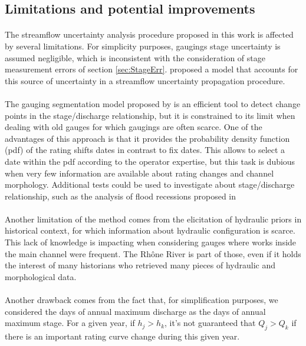 \documentclass[11pt]{article}
\begin{document}
    
    \subsection{Limitations and potential improvements}
    \paragraph{}
    The streamflow uncertainty analysis procedure proposed in this work is affected by several limitations. For simplicity purposes, gaugings stage uncertainty is assumed negligible, which is inconsistent with the consideration of stage measurement errors of section \ref{sec:StageErr}. \citet{horner_impact_2018} proposed a model that accounts for this source of uncertainty in a streamflow uncertainty propagation procedure.  
    \paragraph{}
    The gauging segmentation model proposed by \citet{darienzo_detection_2021} is an efficient tool to detect change points in the stage/discharge relationship, but it is constrained to its limit when dealing with old gauges for which gaugings are often scarce. One of the advantages of this approach is that it provides the probability density function (pdf) of the rating shifts dates in contrast to fix dates. This allows to select a date within the pdf according to the operator expertise, but this task is dubious when very few information are available about rating changes and channel morphology. Additional tests could be used to investigate about stage/discharge relationship, such as the analysis of flood recessions proposed in \citet{darienzo_detection_2021-1}
    \paragraph{}
    Another limitation of the method comes from the elicitation of hydraulic priors in historical context, for which information about hydraulic configuration is scarce. This lack of knowledge is impacting when considering gauges where works inside the main channel were frequent. The Rhône River is part of those, even if it holds the interest of many historians who retrieved many pieces of hydraulic and morphological data. 
    \paragraph{}
    Another drawback comes from the fact that, for simplification purposes, we considered the days of annual maximum discharge as the days of annual maximum stage. For a given year, if $h_{j} > h_{k}$, it's not guaranteed that $Q_{j} > Q_{k}$ if there is an important rating curve change during this given year. 
\end{document}
